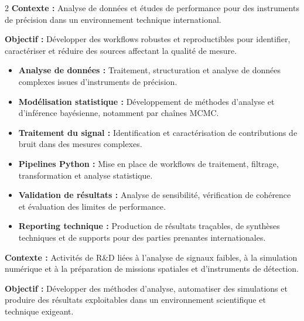 \documentclass[8pt,a4paper,ragged2e,withhyper]{altacv}
\begin{document}
\begin{paracol}{2}
\textbf{Contexte :} Analyse de données et études de performance pour des instruments de précision dans un environnement technique international.

\textbf{Objectif :} Développer des workflows robustes et reproductibles pour identifier, caractériser et réduire des sources affectant la qualité de mesure.

\begin{itemize}
  \item \textbf{Analyse de données :} Traitement, structuration et analyse de données complexes issues d'instruments de précision.
  \item \textbf{Modélisation statistique :} Développement de méthodes d'analyse et d'inférence bayésienne, notamment par chaînes MCMC.
  \item \textbf{Traitement du signal :} Identification et caractérisation de contributions de bruit dans des mesures complexes.
  \item \textbf{Pipelines Python :} Mise en place de workflows de traitement, filtrage, transformation et analyse statistique.
  \item \textbf{Validation de résultats :} Analyse de sensibilité, vérification de cohérence et évaluation des limites de performance.
  \item \textbf{Reporting technique :} Production de résultats traçables, de synthèses techniques et de supports pour des parties prenantes internationales.
\end{itemize}

\divider


\textbf{Contexte :} Activités de R\&D liées à l'analyse de signaux faibles, à la simulation numérique et à la préparation de missions spatiales et d'instruments de détection.

\textbf{Objectif :} Développer des méthodes d'analyse, automatiser des simulations et produire des résultats exploitables dans un environnement scientifique et technique exigeant.


\end{paracol}
\end{document}
